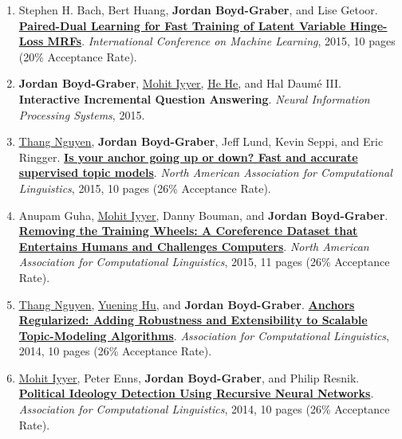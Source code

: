 {\begin{enumerate}
	 \item Stephen H. Bach, Bert Huang, {\bf Jordan Boyd-Graber}, and Lise Getoor.  {\bf \href{http://cs.umd.edu/~jbg//docs/2015_icml_paired_dual.pdf}{Paired-Dual Learning for Fast Training of Latent Variable Hinge-Loss MRFs}}.  \emph{International Conference on Machine Learning}, 2015, 10 pages (20\% Acceptance Rate).

	 \item {\bf Jordan Boyd-Graber}, \underline{\href{https://people.cs.umass.edu/~miyyer/}{Mohit Iyyer}}, \underline{\href{https://hhexiy.github.io/}{He He}}, and Hal {Daum\'{e} III}.  {\bf Interactive Incremental Question Answering}.  \emph{Neural Information Processing Systems}, 2015.

	 \item \underline{\href{https://www.linkedin.com/in/thang-nguyen-a4a04922}{Thang Nguyen}}, {\bf Jordan Boyd-Graber}, Jeff Lund, Kevin Seppi, and Eric Ringger.  {\bf \href{http://cs.umd.edu/~jbg//docs/2015_naacl_supervised_anchor.pdf}{Is your anchor going up or down?  {F}ast and accurate supervised topic models}}.  \emph{North American Association for Computational Linguistics}, 2015, 10 pages (26\% Acceptance Rate).

	 \item Anupam Guha, \underline{\href{https://people.cs.umass.edu/~miyyer/}{Mohit Iyyer}}, Danny Bouman, and {\bf Jordan Boyd-Graber}.  {\bf \href{http://cs.umd.edu/~jbg//docs/2015_naacl_qb_coref.pdf}{Removing the Training Wheels: A Coreference Dataset that Entertains Humans and Challenges Computers}}.  \emph{North American Association for Computational Linguistics}, 2015, 11 pages (26\% Acceptance Rate).

	 \item \underline{\href{https://www.linkedin.com/in/thang-nguyen-a4a04922}{Thang Nguyen}}, \underline{\href{https://scholar.google.com/citations?user=mO_62fQAAAAJ&hl=en}{Yuening Hu}}, and {\bf Jordan Boyd-Graber}.  {\bf \href{http://cs.umd.edu/~jbg//docs/2014_acl_anchor_reg.pdf}{Anchors Regularized: Adding Robustness and Extensibility to Scalable Topic-Modeling Algorithms}}.  \emph{Association for Computational Linguistics}, 2014, 10 pages (26\% Acceptance Rate).

	 \item \underline{\href{https://people.cs.umass.edu/~miyyer/}{Mohit Iyyer}}, Peter Enns, {\bf Jordan Boyd-Graber}, and Philip Resnik.  {\bf \href{http://cs.umd.edu/~jbg//docs/2014_acl_rnn_ideology.pdf}{Political Ideology Detection Using Recursive Neural Networks}}.  \emph{Association for Computational Linguistics}, 2014, 10 pages (26\% Acceptance Rate).


\end{enumerate}}
